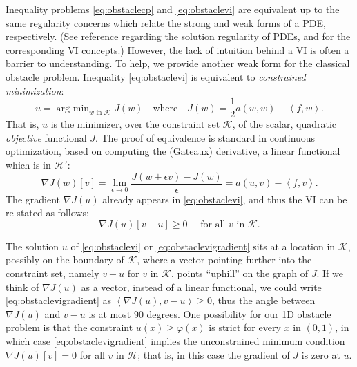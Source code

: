 \documentclass[letterpaper,final,12pt,reqno]{amsart}
\newcommand{\eps}{\epsilon}
\newcommand{\grad}{\nabla}
\newcommand{\ip}[2]{\left<#1,#2\right>}
\numberwithin{equation}{section}
\numberwithin{figure}{section}
\numberwithin{table}{section}
\begin{document}
Inequality problems \eqref{eq:obstaclecp} and \eqref{eq:obstaclevi} are equivalent up to the same regularity concerns which relate the strong and weak forms of a PDE, respectively.  (See reference \cite{Evans2010} regarding the solution regularity of PDEs, and \cite{KinderlehrerStampacchia1980} for the corresponding VI concepts.)  However, the lack of intuition behind a VI is often a barrier to understanding.  To help, we provide another weak form for the classical obstacle problem.  Inequality \eqref{eq:obstaclevi} is equivalent to \emph{constrained minimization}:
\newcommand{\argmin}{\mathop{\mathrm{arg\text{-}min}}}
\begin{equation}
  u = \argmin_{w \text{ in } \mathcal{K}} J(w) \quad \text{where} \quad J(w) = \frac{1}{2} a(w,w) - \ip{f}{w}. \label{eq:obstaclemin}
\end{equation}
That is, $u$ is the minimizer, over the constraint set $\mathcal{K}$, of the scalar, quadratic \emph{objective} functional $J$.  The proof of equivalence is standard in continuous optimization, based on computing the (Gateaux) derivative, a linear functional which is in $\mathcal{H}'$:
\begin{equation}
  \grad J(w)[v] = \lim_{\eps\to 0} \frac{J(w+\eps v) - J(w)}{\eps} = a(u,v) - \ip{f}{v}.  \label{eq:gradobjective}
\end{equation}
The gradient $\nabla J(u)$ already appears in \eqref{eq:obstaclevi}, and thus the VI can be re-stated as follows:
\begin{equation}
  \nabla J(u)[v-u] \ge 0 \quad \text{ for all } v \text{ in } \mathcal{K}. \label{eq:obstaclevigradient}
\end{equation}

The solution $u$ of \eqref{eq:obstaclevi} or \eqref{eq:obstaclevigradient} sits at a location in $\mathcal{K}$, possibly on the boundary of $\mathcal{K}$, where a vector pointing further into the constraint set, namely $v-u$ for $v$ in $\mathcal{K}$, points ``uphill'' on the graph of $J$.  If we think of $\nabla J(u)$ as a vector, instead of a linear functional, we could write \eqref{eq:obstaclevigradient} as $\ip{\nabla J(u)}{v-u} \ge 0$, thus the angle between $\nabla J(u)$ and $v-u$ is at most 90 degrees.  One possibility for our 1D obstacle problem is that the constraint $u(x)\ge \varphi(x)$ is strict for every $x$ in $(0,1)$, in which case \eqref{eq:obstaclevigradient} implies the unconstrained minimum condition $\nabla J(u)[v] = 0$ for all $v$ in $\mathcal{H}$; that is, in this case the gradient of $J$ is zero at $u$.
\end{document}
